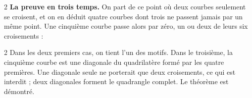 \documentclass[10pt]{article}
\newcommand{\ligne}[3][bleu]{\draw[#1,line width=1pt,shorten <=-6cm,shorten >=-6cm] (#2) -- (#3);}
\newcommand{\disque}{\draw[gris!70,dashed] (0,0) circle (1.6); \clip (0,0) circle (1.6);}
\begin{document}
{\begin{multicols}{2}
\textbf{La preuve en trois temps.} On part de ce point où deux courbes seulement se croisent, et on en déduit quatre courbes dont trois ne passent jamais par un même point. Une cinquième courbe passe alors par zéro, un ou deux de leurs six croisements :
\end{multicols}
\vspace{2mm}
\noindent{}\par\vspace{2mm}
\begin{multicols}{2}
Dans les deux premiers cas, on tient l'un des motifs. Dans le troisième, la cinquième courbe est une diagonale du quadrilatère formé par les quatre premières. Une diagonale seule ne porterait que deux croisements, ce qui est interdit ; deux diagonales forment le quadrangle complet. Le théorème est démontré.


\end{multicols}}
\end{document}
